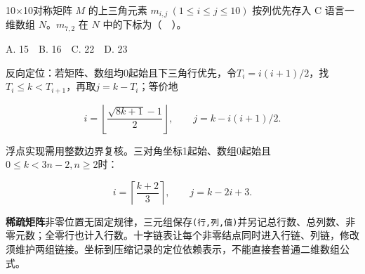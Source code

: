 10\ensuremath{\times}10对称矩阵 \(M\) 的上三角元素 \(m_{i,j}\ (1\le i\le j\le10)\) 按列优先存入 C 语言一维数组 \(N\)。\(m_{7,2}\) 在 \(N\) 中的下标为（　）。

A. 15　B. 16　C. 22　D. 23

反向定位：若矩阵、数组均0起始且下三角行优先，令\(T_i=i(i+1)/2\)，找\(T_i\le k<T_{i+1}\)，再取\(j=k-T_i\)；等价地

\[i=\left\lfloor\frac{\sqrt{8k+1}-1}{2}\right\rfloor,\qquad j=k-i(i+1)/2.\]

浮点实现需用整数边界复核。三对角坐标1起始、数组0起始且\(0\le k<3n-2,n\ge2\)时：

\[i=\left\lceil\frac{k+2}{3}\right\rceil,\qquad j=k-2i+3.\]

\textbf{稀疏矩阵}非零位置无固定规律，三元组保存\texttt{(\allowbreak{}行,\allowbreak{}列,\allowbreak{}值)\allowbreak{}}并另记总行数、总列数、非零元数；全零行也计入行数。十字链表让每个非零结点同时进入行链、列链，修改须维护两组链接。坐标到压缩记录的定位依赖表示，不能直接套普通二维数组公式。
